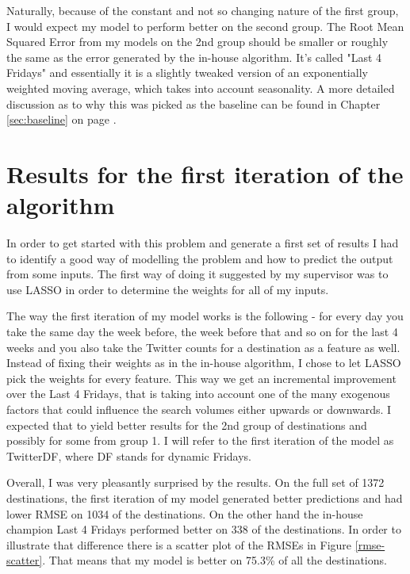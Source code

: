 \documentclass[minf,frontabs,twoside,singlespacing,parskip]{infthesis}
\begin{document}
Naturally, because of the constant and not so changing nature of the first group, I would expect my model to perform better on the second group. The Root Mean Squared Error from my models on the 2nd group should be smaller or roughly the same as the error generated by the in-house algorithm. It's called  "Last 4 Fridays" and essentially it is a slightly tweaked version of an exponentially weighted moving average, which takes into account seasonality. A more detailed discussion as to why this was picked as the baseline can be found in Chapter \ref{sec:baseline} on page \pageref{sec:baseline}.


\section{Results for the first iteration of the algorithm}
\label{TwitterDF}


In order to get started with this problem and generate a first set of results I had to identify a good way of modelling the problem and how to predict the output from some inputs. The first way of doing it suggested by my supervisor was to use LASSO \cite{lasso} in order to determine the weights for all of my inputs. 


The way the first iteration of my model works is the following - for every day you take the same day the week before, the week before that and so on for the last 4 weeks and you also take the Twitter counts for a destination as a feature as well. Instead of fixing their weights as in the in-house algorithm, I chose to let LASSO pick the weights for every feature. This way we get an incremental improvement over the Last 4 Fridays, that is taking into account one of the many exogenous factors that could influence the search volumes either upwards or downwards. I expected that to yield better results for the 2nd group of destinations and possibly for some from group 1. I will refer to the first iteration of the model as TwitterDF, where DF stands for dynamic Fridays. 


Overall, I was very pleasantly surprised by the results. On the full set of 1372 destinations, the first iteration of my model generated better predictions and had lower RMSE on 1034 of the destinations. On the other hand the in-house champion Last 4 Fridays performed better on 338 of the destinations. In order to illustrate that difference there is a scatter plot of the RMSEs in Figure \ref{rmse-scatter}. That means that my model is better on 75.3\% of all the destinations.
\end{document}
